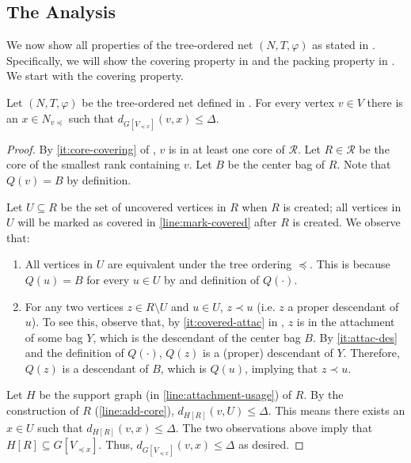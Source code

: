 \documentclass{article}
\def\coreSet{\mathcal{R}}
\def\core{R}
\begin{document}
\subsection{The Analysis}


We now show all properties of the tree-ordered net $(N,T,\varphi)$ as stated in . Specifically, we will show the covering property in  and the packing property in . We start with the covering property.

\begin{lemma}
	\label{lem:covering}
	Let $(N,T,\varphi)$ be the tree-ordered net defined in .  For every vertex $v \in V$ there is an $x\in N_{v\preceq}$ such that $d_{G[V_{\preceq x}]}(v,x)\le \Delta$.
\end{lemma}
\begin{proof} By \cref{it:core-covering} of ,  $v$ is in at least one core of $\coreSet$.  Let $R \in \coreSet$ be the core of the smallest rank containing $v$. Let $B$ be the center bag of $R$. Note that $Q(v) = B$ by definition.
	
	Let $U\subseteq \core$ be the set of uncovered vertices in $\core$ when $R$ is created; all vertices in $U$ will be marked as covered in \cref{line:mark-covered} after $R$ is created.  We observe that:
	\begin{enumerate}
		\item All vertices in $U$ are equivalent under the tree ordering $\preceq$. This is because $Q(u)=B$ for every $u\in U$  by  and definition of $Q(\cdot)$.
		\item  For any two vertices $z\in R\setminus U$ and $u\in U$, $z \prec u$ (i.e. $z$ a proper descendant of $u$). To see this, observe that, by  \cref{it:covered-attac} in ,  $z$ is in the attachment of some bag $Y$, which is the descendant of the center bag $B$.   By \cref{it:attac-des} and the definition of $Q(\cdot)$, $Q(z)$ is a (proper) descendant of $Y$. Therefore, $Q(z)$ is a descendant of $B$, which is $Q(u)$, implying that $z\prec u$.
	\end{enumerate}
	Let $H$ be the support graph (in \cref{line:attachment-usage}) of $R$. By the construction of $\core$ (\cref{line:add-core}), $d_{H[R]}(v,U)\leq \Delta$.  This means there exists an $x\in U$ such that  $d_{H[R]}(v,x)\leq \Delta$. The two observations above imply that $H[R] \subseteq G[V_{\preceq x}]$. Thus, $d_{G[V_{\preceq x}]}(v,x)\leq \Delta$ as desired.       
\end{proof} 
\end{document}
